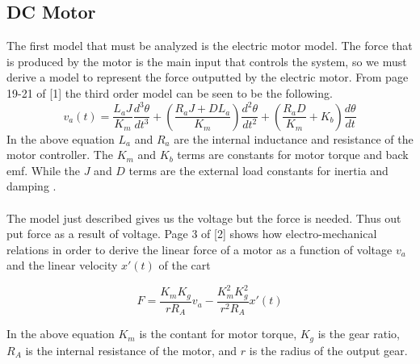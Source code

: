 \documentclass[12pt]{article} %
\begin{document}
\subsection{DC Motor}
The first model that must be analyzed is the electric motor model. The force that is produced by the motor is the main input that controls the system, so we must derive a model to represent the force outputted by the electric motor. From page 19-21 of [1] the third order model can be seen to be the following.
\begin{equation}
v_{a}(t) = \frac{L_aJ}{K_m} \frac{d^3\theta}{dt^3} + (\frac{R_aJ + DL_a}{K_m})\frac{d^2\theta}{dt^2} + (\frac{R_aD}{K_m} + K_b)\frac{d\theta}{dt}
\end{equation}
In the above equation $L_a$ and $R_a$ are the internal inductance and resistance of the motor controller. The $K_m$ and $K_b$ terms are constants for motor torque and back emf. While the $J$ and $D$ terms are the external load constants for inertia and damping . \\\\
The model just described gives us the voltage but the force is needed. Thus out put force as a result of voltage. Page 3 of [2] shows how electro-mechanical relations in order to derive the linear force of a motor as a function of voltage $v_{a}$ and the linear velocity $x'(t)$ of the cart   

\begin{equation} \label{eq:voltage}
F = \frac{K_mK_g}{rR_A}v_{a} - \frac{K_m^2K_g^2}{r^2R_A}x'(t) 
\end{equation}

In the above equation $K_m$ is the contant for motor torque, $K_g$ is the gear ratio, $R_A$ is the internal resistance of the motor, and $r$ is the radius of the output gear.
\end{document}
